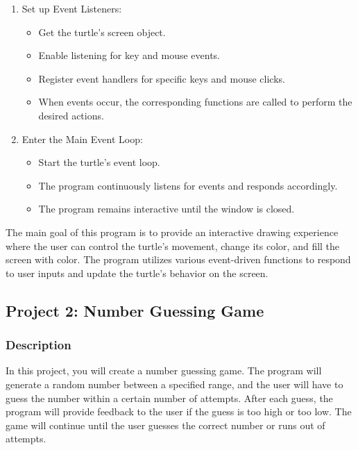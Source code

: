 \documentclass[12pt]{article}
\begin{document}
\begin{enumerate}[label=\arabic*.]
  \item Set up Event Listeners:
    \begin{itemize}
      \item Get the turtle's screen object.
      \item Enable listening for key and mouse events.
      \item Register event handlers for specific keys and mouse clicks.
      \item When events occur, the corresponding functions are called to perform the desired actions.
    \end{itemize}
  
  \item Enter the Main Event Loop:
    \begin{itemize}
      \item Start the turtle's event loop.
      \item The program continuously listens for events and responds accordingly.
      \item The program remains interactive until the window is closed.
    \end{itemize}
\end{enumerate}

The main goal of this program is to provide an interactive drawing experience where the user can control the turtle's movement, change its color, and fill the screen with color. The program utilizes various event-driven functions to respond to user inputs and update the turtle's behavior on the screen.
\newpage
\subsection{Project 2: Number Guessing Game}

\subsubsection{Description}
In this project, you will create a number guessing game. The program will generate a random number between a specified range, and the user will have to guess the number within a certain number of attempts. After each guess, the program will provide feedback to the user if the guess is too high or too low. The game will continue until the user guesses the correct number or runs out of attempts.
\end{document}
